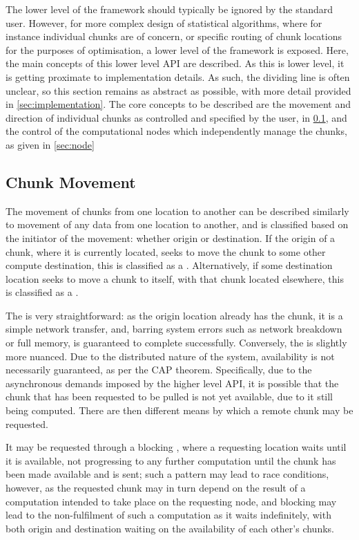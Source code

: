 The lower level of the \lsr{} framework should typically be ignored by the standard user.
However, for more complex design of statistical algorithms, where for instance individual chunks are of concern, or specific routing of chunk locations for the purposes of optimisation, a lower level of the framework is exposed.
Here, the main concepts of this lower level API are described.
As this is lower level, it is getting proximate to implementation details.
As such, the dividing line is often unclear, so this section remains as abstract as possible, with more detail provided in \cref{sec:implementation}.
The core concepts to be described are the movement and direction of individual chunks as controlled and specified by the user, in \cref{sec:cm}, and the control of the computational nodes which independently manage the chunks, as given in \cref{sec:node}

\subsection{Chunk Movement}\label{sec:cm}

The movement of chunks from one location to another can be described similarly to movement of any data from one location to another, and is classified based on the initiator of the movement: whether origin or destination.
If the origin of a chunk, where it is currently located, seeks to move the chunk to some other compute destination, this is classified as a .
Alternatively, if some destination location seeks to move a chunk to itself, with that chunk located elsewhere, this is classified as a .

The  is very straightforward: as the origin location already has the chunk, it is a simple network transfer, and, barring system errors such as network breakdown or full memory, is guaranteed to complete successfully.
Conversely, the  is slightly more nuanced.
Due to the distributed nature of the system, availability is not necessarily guaranteed, as per the CAP theorem\cite{gilbert2002brewer}.
Specifically, due to the asynchronous demands imposed by the higher level API, it is possible that the chunk that has been requested to be pulled is not yet available, due to it still being computed.
There are then different means by which a remote chunk may be requested.

It may be requested through a blocking , where a requesting location waits until it is available, not progressing to any further computation until the chunk has been made available and is sent; such a pattern may lead to race conditions, however, as the requested chunk may in turn depend on the result of a computation intended to take place on the requesting node, and blocking may lead to the non-fulfilment of such a computation as it waits indefinitely, with both origin and destination waiting on the availability of each other's chunks.

